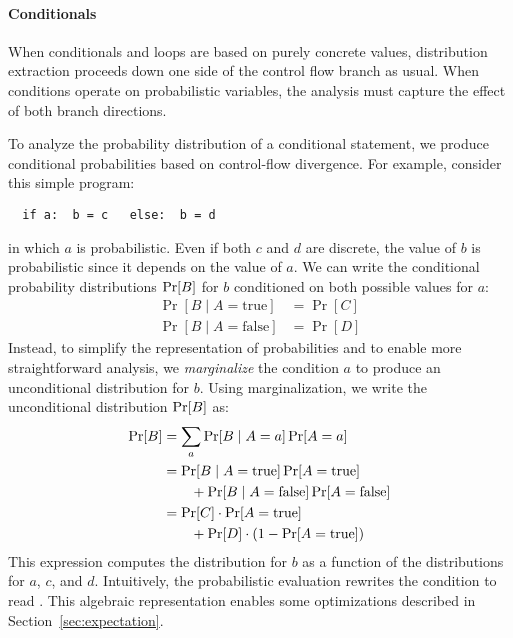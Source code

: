 
\label{sec:conditionals}


\paragraph{Conditionals}
When conditionals and loops are based on purely
concrete values, distribution extraction proceeds down one side
of the control flow branch as usual. When conditions operate on probabilistic variables, the analysis
must capture the effect of both branch directions.

To analyze the probability distribution of a conditional statement,
we produce conditional probabilities
based on control-flow divergence. For example, consider this simple
program:
%
\begin{lstlisting}
  if a:  b = c   else:  b = d
\end{lstlisting}
%
in which $a$ is probabilistic. Even if both $c$
and $d$ are discrete, the value of $b$ is probabilistic since it depends on
the value of $a$. We can write the conditional probability distributions $\Pr\!\left[B\right]$
for $b$ conditioned on both possible values for $a$:
%
\begin{align*}
  \Pr[B \;|\; A = \mathrm{true}] &= \Pr[C]\\
  \Pr[B \;|\; A = \mathrm{false}] &= \Pr[D]
\end{align*}
%
Instead, to simplify the representation of probabilities and to enable more
straightforward analysis, we \emph{marginalize} the condition $a$ to
produce an unconditional distribution for $b$. Using marginalization, we
write the unconditional distribution $\Pr\!\left[B\right]$ as:
%
\begin{align*}
    \Pr[B] &= \sum_a \Pr[B\;|\; A = a] \Pr\!\left[A = a\right] \\
           &= \Pr[B \;|\; A = \mathrm{true}] \Pr\!\left[A = \mathrm{true}\right] \\
           & \qquad {}
            + \Pr[B \;|\; A = \mathrm{false}] \Pr\!\left[A = \mathrm{false}\right] \\
           &= \Pr[C] \cdot \Pr\!\left[A=\mathrm{true}\right] \\
           & \qquad {}
            + \Pr[D] \cdot (1 - \Pr\!\left[A=\mathrm{true}\right])
\end{align*}
%
This expression computes the distribution for $b$ as a function of the
distributions for $a$, $c$, and $d$. Intuitively, the probabilistic evaluation rewrites
the condition to read . This algebraic
representation enables some optimizations described
in Section~\ref{sec:expectation}.


